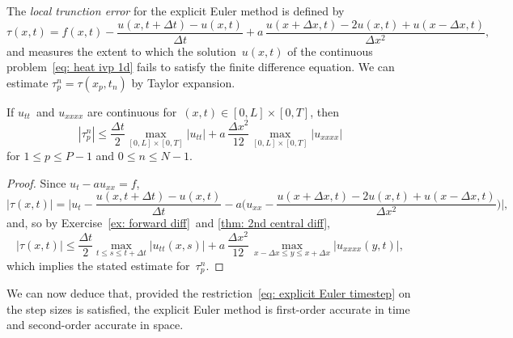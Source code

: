 The \emph{local trunction error} for the explicit Euler method is defined by
\begin{equation}\label{eq: tau explicit Euler}
\tau(x,t)=f(x,t)-\frac{u(x,t+\Delta t)-u(x,t)}{\Delta t}
	+a\,\frac{u(x+\Delta x,t)-2u(x,t)+u(x-\Delta x,t)}{\Delta x^2},
\end{equation}
and measures the extent to which the solution~$u(x,t)$ of the continuous 
problem~\eqref{eq: heat ivp 1d} fails to satisfy the finite difference equation.
We can estimate $\tau^n_p=\tau(x_p,t_n)$ by Taylor expansion.

\begin{lemma}\label{lem: tau explicit Euler}
If $u_{tt}$~and $u_{xxxx}$ are continuous for~$(x,t)\in[0,L]\times[0,T]$, then
\[
|\tau^n_p|\le\frac{\Delta t}{2}\max_{[0,L]\times[0,T]}|u_{tt}|
	+a\,\frac{\Delta x^2}{12}\max_{[0,L]\times[0,T]}|u_{xxxx}|
\]
for $1\le p\le P-1$ and $0\le n\le N-1$.
\end{lemma}
\begin{proof}
Since $u_t-au_{xx}=f$,
\[
|\tau(x,t)|=\biggl|u_t-\frac{u(x,t+\Delta t)-u(x,t)}{\Delta t}
	-a\biggl(u_{xx}-\frac{u(x+\Delta x,t)-2u(x,t)+u(x-\Delta x,t)}{\Delta x^2}
\biggr)\biggr|,
\]
and, so by Exercise~\ref{ex: forward diff}~and \cref{thm: 2nd central diff},
\[
|\tau(x,t)|\le\frac{\Delta t}{2}\max_{t\le s\le t+\Delta t}|u_{tt}(x,s)|
	+a\,\frac{\Delta x^2}{12}\,
	\max_{x-\Delta x\le y\le x+\Delta x}|u_{xxxx}(y,t)|,
\]
which implies the stated estimate for~$\tau^n_p$. 
\end{proof}

We can now deduce that, provided the
restriction~\eqref{eq: explicit Euler timestep} on the step sizes is satisfied,
the explicit Euler method is first-order accurate in time and second-order 
accurate in space.

